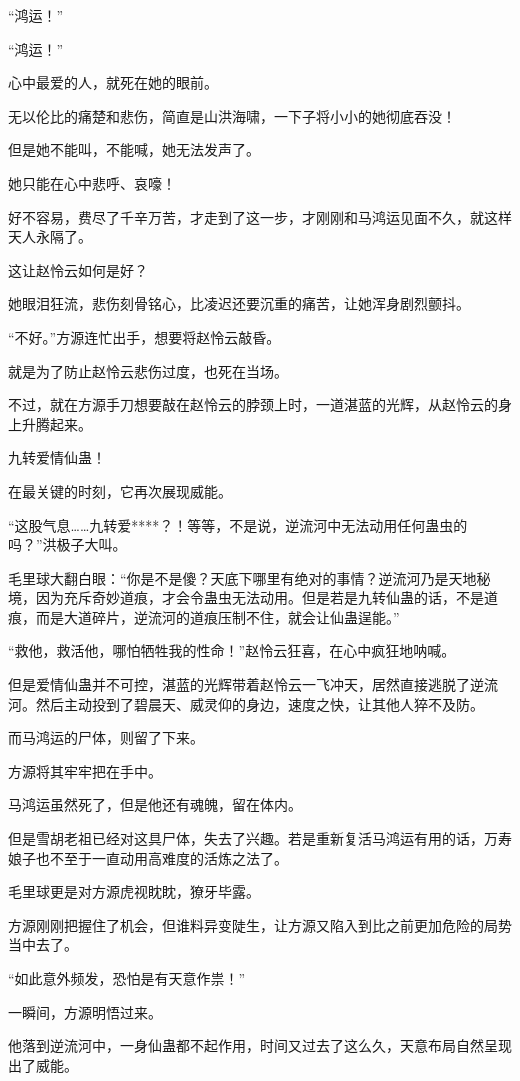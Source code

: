 \begin{this_body}
“鸿运！”

“鸿运！”

心中最爱的人，就死在她的眼前。

无以伦比的痛楚和悲伤，简直是山洪海啸，一下子将小小的她彻底吞没！

但是她不能叫，不能喊，她无法发声了。

她只能在心中悲呼、哀嚎！

好不容易，费尽了千辛万苦，才走到了这一步，才刚刚和马鸿运见面不久，就这样天人永隔了。

这让赵怜云如何是好？

她眼泪狂流，悲伤刻骨铭心，比凌迟还要沉重的痛苦，让她浑身剧烈颤抖。

“不好。”方源连忙出手，想要将赵怜云敲昏。

就是为了防止赵怜云悲伤过度，也死在当场。

不过，就在方源手刀想要敲在赵怜云的脖颈上时，一道湛蓝的光辉，从赵怜云的身上升腾起来。

九转爱情仙蛊！

在最关键的时刻，它再次展现威能。

“这股气息……九转爱****？！等等，不是说，逆流河中无法动用任何蛊虫的吗？”洪极子大叫。

毛里球大翻白眼：“你是不是傻？天底下哪里有绝对的事情？逆流河乃是天地秘境，因为充斥奇妙道痕，才会令蛊虫无法动用。但是若是九转仙蛊的话，不是道痕，而是大道碎片，逆流河的道痕压制不住，就会让仙蛊逞能。”

“救他，救活他，哪怕牺牲我的性命！”赵怜云狂喜，在心中疯狂地呐喊。

但是爱情仙蛊并不可控，湛蓝的光辉带着赵怜云一飞冲天，居然直接逃脱了逆流河。然后主动投到了碧晨天、威灵仰的身边，速度之快，让其他人猝不及防。

而马鸿运的尸体，则留了下来。

方源将其牢牢把在手中。

马鸿运虽然死了，但是他还有魂魄，留在体内。

但是雪胡老祖已经对这具尸体，失去了兴趣。若是重新复活马鸿运有用的话，万寿娘子也不至于一直动用高难度的活炼之法了。

毛里球更是对方源虎视眈眈，獠牙毕露。

方源刚刚把握住了机会，但谁料异变陡生，让方源又陷入到比之前更加危险的局势当中去了。

“如此意外频发，恐怕是有天意作祟！”

一瞬间，方源明悟过来。

他落到逆流河中，一身仙蛊都不起作用，时间又过去了这么久，天意布局自然呈现出了威能。


\end{this_body}
